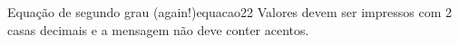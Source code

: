 \documentclass[12pt,a4paper,oneside]{article}
\begin{document}
\begin{problem}{Equação de segundo grau (again!)}{equacao2}{2}
Valores devem ser impressos com 2 casas decimais e a mensagem não deve conter acentos.


\Example

\begin{example}
%
\end{example}

\begin{example}
%
\end{example}

\begin{example}
%
\end{example}

\begin{example}
%
\end{example}


\end{problem}
\end{document}
